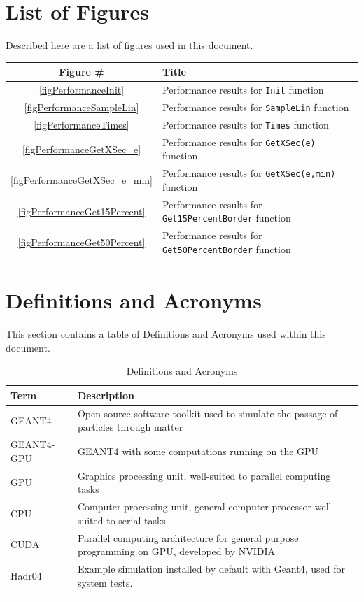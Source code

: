 \documentclass[12pt]{article}
\begin{document}
\section*{List of Figures}
Described here are a list of figures used in this document.
\begin{center}
\begin{tabular}{cl}
\toprule
\bf Figure \# & \bf Title\\\midrule
\ref{figPerformanceInit} & Performance results for \texttt{Init} function\\
\ref{figPerformanceSampleLin} & Performance results for \texttt{SampleLin} function\\
\ref{figPerformanceTimes} & Performance results for \texttt{Times} function\\
\ref{figPerformanceGetXSec_e} & Performance results for \texttt{GetXSec(e)} function\\
\ref{figPerformanceGetXSec_e_min} & Performance results for \texttt{GetXSec(e,min)} function\\
\ref{figPerformanceGet15Percent} & Performance results for \texttt{Get15PercentBorder} function\\
\ref{figPerformanceGet50Percent} & Performance results for \texttt{Get50PercentBorder} function\\
\bottomrule
\end{tabular}
\end{center}

\section*{Definitions and Acronyms} %
This section contains a table of Definitions and Acronyms used within this document.
\begin{table}[h]
\centering
\caption{Definitions and Acronyms}\label{Table_DefAndAcro}
\begin{tabularx}{\textwidth}{lX}
\toprule
\bf Term & \bf Description\\\midrule
GEANT4 & Open-source software toolkit used to simulate the passage of particles through matter\\
GEANT4-GPU & GEANT4 with some computations running on the GPU\\
GPU & Graphics processing unit, well-suited to parallel computing tasks\\
CPU & Computer processing unit, general computer processor well-suited to serial tasks\\
CUDA & Parallel computing architecture for general purpose programming on GPU, developed by NVIDIA\\
Hadr04 & Example simulation installed by default with Geant4, used for system tests.\\
\Xhline{2\arrayrulewidth}
\end{tabularx}
\end{table}
\end{document}
